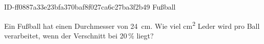 \begin{exercise}
      {ID-ff0887a33e23bfa370baf8f027ca6c27ba3f2b49}
      {Fußball}
  \ifproblem\problem\par
    Ein Fußball hat einen Durchmesser von
    \SI{24}{\centi\metre}.
    Wie viel \si{\square\centi\metre} Leder
    wird pro Ball verarbeitet, wenn der
    Verschnitt bei \num{20}\,{\%} liegt?
  \fi
\end{exercise}
